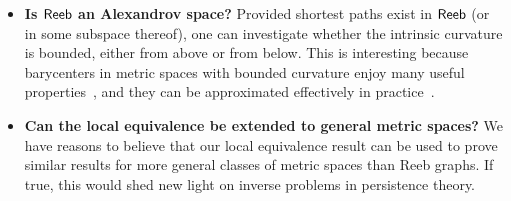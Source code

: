 \begin{itemize}
\item {\bf Is ${\sf Reeb}$ an Alexandrov space?} Provided shortest paths
  exist in ${\sf Reeb}$ (or in some subspace thereof), one can investigate whether
  the intrinsic curvature is bounded, either from above or from
  below.  This is interesting because barycenters in metric spaces
  with bounded curvature enjoy many useful
  properties~\cite{Ohta12}, and they can be approximated
  effectively in practice~\cite{Ohta09}.

\item {\bf Can the local equivalence be extended to general metric
  spaces?} We have reasons to believe that our local equivalence
  result can be used to prove similar results for more general 
  classes of metric spaces than Reeb graphs. If true, this 
  would shed new light on inverse problems in persistence theory.

\end{itemize}  

%
%
